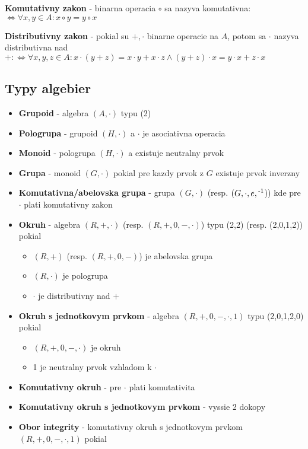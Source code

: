 \documentclass[12pt]{article}
\begin{document}
\textbf{Komutativny zakon} - binarna operacia $\circ$ sa nazyva komutativna:
$\Leftrightarrow \forall x,y \in A: x \circ y = y \circ x$

\textbf{Distributivny zakon} - pokial su $+, \cdot$ binarne operacie na $A$, potom sa $\cdot$ nazyva
distributivna nad $+: \Leftrightarrow \forall x,y,z \in A :
x \cdot (y + z) = x \cdot y + x \cdot z \land (y + z) \cdot x = y \cdot x + z \cdot x$

\subsection{Typy algebier}
\begin{itemize}
	\item \textbf{Grupoid} - algebra $(A, \cdot)$ typu (2)
	\item \textbf{Pologrupa} - grupoid $(H, \cdot)$ a $\cdot$ je asociativna operacia
	\item \textbf{Monoid} - pologrupa $(H, \cdot)$ a existuje neutralny prvok
	\item \textbf{Grupa} - monoid $(G, \cdot)$ pokial pre kazdy prvok z $G$ existuje prvok inverzny
	\item \textbf{Komutativna/abelovska grupa} - grupa $(G, \cdot)$ (resp. $(G, \cdot, e, \textsuperscript{-1}$)) kde pre $\cdot$ plati komutativny zakon
	\item \textbf{Okruh} - algebra $(R,+,\cdot)$ (resp. $(R,+,0,-,\cdot)$) typu (2,2) (resp. (2,0,1,2)) pokial
		\begin{itemize}
			\item $(R, +)$ (resp. $(R,+,0,-)$) je abelovska grupa
			\item $(R, \cdot)$ je pologrupa
			\item $\cdot$ je distributivny nad $+$
		\end{itemize}
	\item \textbf{Okruh s jednotkovym prvkom} - algebra $(R,+,0,-,\cdot,1)$ typu (2,0,1,2,0) pokial
		\begin{itemize}
			\item $(R,+,0,-,\cdot)$ je okruh
			\item 1 je neutralny prvok vzhladom k $\cdot$
		\end{itemize}
	\item \textbf{Komutativny okruh} - pre $\cdot$ plati komutativita
	\item \textbf{Komutativny okruh s jednotkovym prvkom} - vyssie 2 dokopy
	\item \textbf{Obor integrity} - komutativny okruh s jednotkovym prvkom $(R,+,0,-,\cdot,1)$ pokial

\end{itemize}
\end{document}
